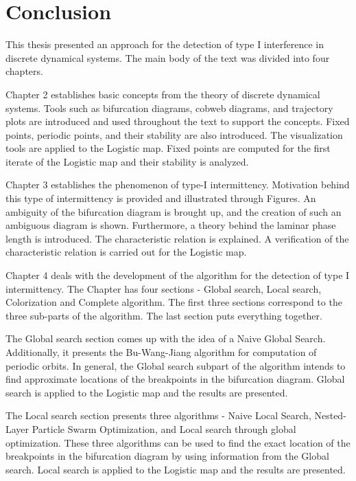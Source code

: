 \chapter{Conclusion}

This thesis presented an approach for the detection of type I interference in discrete dynamical systems.
The main body of the text was divided into four chapters.
\par
Chapter 2 establishes basic concepts from the theory of discrete dynamical systems.
Tools such as bifurcation diagrams, cobweb diagrams, and trajectory plots are introduced and used throughout the text to support the concepts.
Fixed points, periodic points, and their stability are also introduced.
The visualization tools are applied to the Logistic map.
Fixed points are computed for the first iterate of the Logistic map and their stability is analyzed.
\par
Chapter 3 establishes the phenomenon of type-I intermittency.
Motivation behind this type of intermittency is provided and illustrated through Figures.
An ambiguity of the bifurcation diagram is brought up, and the creation of such an ambiguous diagram is shown.
Furthermore, a theory behind the laminar phase length is introduced.
The characteristic relation is explained.
A verification of the characteristic relation is carried out for the Logistic map.
\par
Chapter 4 deals with the development of the algorithm for the detection of type I intermittency.
The Chapter has four sections - Global search, Local search, Colorization and Complete algorithm.
The first three sections correspond to the three sub-parts of the algorithm.
The last section puts everything together.
\par
The Global search section comes up with the idea of a Naive Global Search.
Additionally, it presents the Bu-Wang-Jiang algorithm for computation of periodic orbits.
In general, the Global search subpart of the algorithm intends to find approximate locations of the breakpoints in the bifurcation diagram.
Global search is applied to the Logistic map and the results are presented.
\par
The Local search section presents three algorithms - Naive Local Search, Nested-Layer Particle Swarm Optimization, and Local search through global optimization.
These three algorithms can be used to find the exact location of the breakpoints in the bifurcation diagram by using information from the Global search.
Local search is applied to the Logistic map and the results are presented.
